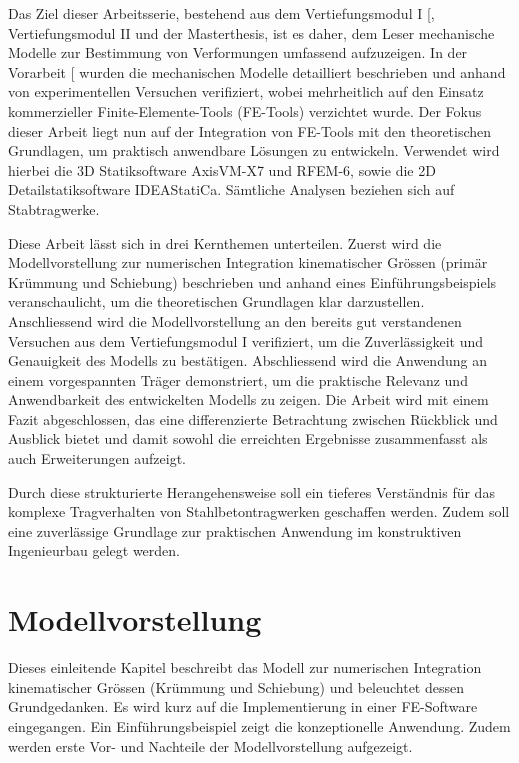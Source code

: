 \documentclass[
  11pt,
  letterpaper,
]{scrreprt}
\begin{document}
Das Ziel dieser Arbeitsserie, bestehend aus dem Vertiefungsmodul I
{[}\citeproc{ref-gitz_ansatze_2024}{1}{]}, Vertiefungsmodul II und der
Masterthesis, ist es daher, dem Leser mechanische Modelle zur Bestimmung
von Verformungen umfassend aufzuzeigen. In der Vorarbeit
{[}\citeproc{ref-gitz_ansatze_2024}{1}{]} wurden die mechanischen
Modelle detailliert beschrieben und anhand von experimentellen Versuchen
verifiziert, wobei mehrheitlich auf den Einsatz kommerzieller
Finite-Elemente-Tools (FE-Tools) verzichtet wurde. Der Fokus dieser
Arbeit liegt nun auf der Integration von FE-Tools mit den theoretischen
Grundlagen, um praktisch anwendbare Lösungen zu entwickeln. Verwendet
wird hierbei die 3D Statiksoftware AxisVM-X7 und RFEM-6, sowie die 2D
Detailstatiksoftware IDEAStatiCa. Sämtliche Analysen beziehen sich auf
Stabtragwerke.

Diese Arbeit lässt sich in drei Kernthemen unterteilen. Zuerst wird die
Modellvorstellung zur numerischen Integration kinematischer Grössen
(primär Krümmung und Schiebung) beschrieben und anhand eines
Einführungsbeispiels veranschaulicht, um die theoretischen Grundlagen
klar darzustellen. Anschliessend wird die Modellvorstellung an den
bereits gut verstandenen Versuchen aus dem Vertiefungsmodul I
verifiziert, um die Zuverlässigkeit und Genauigkeit des Modells zu
bestätigen. Abschliessend wird die Anwendung an einem vorgespannten
Träger demonstriert, um die praktische Relevanz und Anwendbarkeit des
entwickelten Modells zu zeigen. Die Arbeit wird mit einem Fazit
abgeschlossen, das eine differenzierte Betrachtung zwischen Rückblick
und Ausblick bietet und damit sowohl die erreichten Ergebnisse
zusammenfasst als auch Erweiterungen aufzeigt.

Durch diese strukturierte Herangehensweise soll ein tieferes Verständnis
für das komplexe Tragverhalten von Stahlbetontragwerken geschaffen
werden. Zudem soll eine zuverlässige Grundlage zur praktischen Anwendung
im konstruktiven Ingenieurbau gelegt werden.


\chapter{Modellvorstellung}\label{modellvorstellung}

Dieses einleitende Kapitel beschreibt das Modell zur numerischen
Integration kinematischer Grössen (Krümmung und Schiebung) und
beleuchtet dessen Grundgedanken. Es wird kurz auf die Implementierung in
einer FE-Software eingegangen. Ein Einführungsbeispiel zeigt die
konzeptionelle Anwendung. Zudem werden erste Vor- und Nachteile der
Modellvorstellung aufgezeigt.
\end{document}

